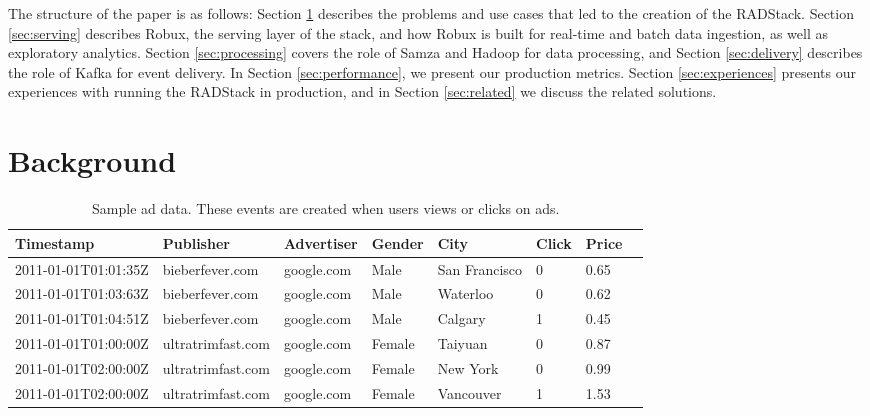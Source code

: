 \documentclass{vldb}
\begin{document}
The structure of the paper is as follows: Section \ref{sec:background}
describes the problems and use cases that led to the creation of the RADStack.
Section \ref{sec:serving} describes Robux, the serving layer of the stack, and
how Robux is built for real-time and batch data ingestion, as well as
exploratory analytics. Section \ref{sec:processing} covers the role of Samza
and Hadoop for data processing, and Section \ref{sec:delivery} describes the
role of Kafka for event delivery. In Section \ref{sec:performance}, we present
our production metrics.  Section \ref{sec:experiences} presents our experiences
with running the RADStack in production, and in Section \ref{sec:related} we
discuss the related solutions.

\section{Background}
\label{sec:background}

\begin{table}
\centering
\begin{tabular}{| l | l | l | l | l | l | l | l |}
  \hline
  \textbf{Timestamp} & \textbf{Publisher} & \textbf{Advertiser} & \textbf{Gender} & \textbf{City} & \textbf{Click} & \textbf{Price} \\ \hline
  2011-01-01T01:01:35Z & bieberfever.com & google.com & Male & San Francisco & 0 & 0.65 \\ \hline
  2011-01-01T01:03:63Z & bieberfever.com & google.com & Male & Waterloo & 0 & 0.62 \\ \hline
  2011-01-01T01:04:51Z & bieberfever.com & google.com & Male & Calgary & 1 & 0.45 \\ \hline
  2011-01-01T01:00:00Z & ultratrimfast.com & google.com & Female & Taiyuan & 0 & 0.87 \\ \hline
  2011-01-01T02:00:00Z & ultratrimfast.com & google.com & Female & New York & 0 & 0.99 \\ \hline
  2011-01-01T02:00:00Z & ultratrimfast.com & google.com & Female & Vancouver & 1 & 1.53 \\ \hline
\end{tabular}
\caption{Sample ad data. These events are created when users views or clicks on ads.}
\label{tab:sample_data}
\end{table}
\end{document}
